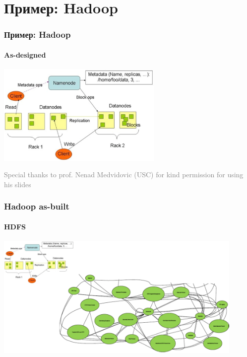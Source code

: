 \documentclass[xetex,mathserif,serif]{beamer}
\newcommand{\attribution}[1] {
    \begin{flushright}\begin{scriptsize}\textcolor{gray}{#1}\end{scriptsize}\end{flushright}
}
\begin{document}
    \section{Пример: Hadoop}

    \begin{frame}
        \frametitle{Пример: Hadoop}
        \framesubtitle{As-designed}
        \begin{center}
            \includegraphics[width=0.6\textwidth]{hadoopPrescriptive.png}
        \end{center}
        \attribution{Special thanks to prof. Nenad Medvidovic (USC) for kind permission for using his slides}
    \end{frame}

    \begin{frame}
        \frametitle{Hadoop as-built}
        \framesubtitle{HDFS}
        \begin{center}
            \includegraphics[width=0.9\textwidth]{hadoopDescriptive.png}
        \end{center}
    \end{frame}
\end{document}
